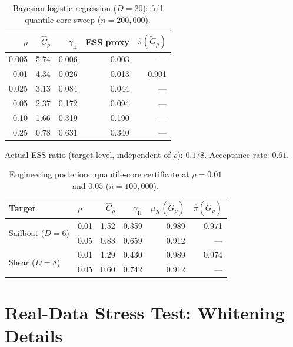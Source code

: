 \documentclass[12pt]{article}
\begin{document}
\begin{table}[h]
\centering
\caption{Bayesian logistic regression ($D = 20$): full quantile-core sweep ($n = 200{,}000$).}
\label{tab:q-logreg}
\small
\begin{tabular}{rrrrr}
\toprule
$\rho$ & $\hat{C}_\rho$ & $\gamma_{\mathrm{II}}$ & ESS proxy & $\hat{\pi}(\tilde{G}_\rho)$ \\
\midrule
0.005 & 5.74 & 0.006 & 0.003 & --- \\
0.01  & 4.34 & 0.026 & 0.013 & 0.901 \\
0.025 & 3.13 & 0.084 & 0.044 & --- \\
0.05  & 2.37 & 0.172 & 0.094 & --- \\
0.10  & 1.66 & 0.319 & 0.190 & --- \\
0.25  & 0.78 & 0.631 & 0.340 & --- \\
\bottomrule
\end{tabular}

\smallskip
\begin{minipage}{\linewidth}
\small Actual ESS ratio (target-level, independent of $\rho$): $0.178$. Acceptance rate: $0.61$.
\end{minipage}
\end{table}

\begin{table}[h]
\centering
\caption{Engineering posteriors: quantile-core certificate at $\rho = 0.01$ and $0.05$ ($n = 100{,}000$).}
\label{tab:q-eng}
\small
\begin{tabular}{ll rrrr}
\toprule
Target & $\rho$ & $\hat{C}_\rho$ & $\gamma_{\mathrm{II}}$ & $\mu_K(\tilde{G}_\rho)$ & $\hat{\pi}(\tilde{G}_\rho)$ \\
\midrule
\multirow{2}{*}{Sailboat ($D=6$)}
 & 0.01 & 1.52 & 0.359 & 0.989 & 0.971 \\
 & 0.05 & 0.83 & 0.659 & 0.912 & --- \\
\midrule
\multirow{2}{*}{Shear ($D=8$)}
 & 0.01 & 1.29 & 0.430 & 0.989 & 0.974 \\
 & 0.05 & 0.60 & 0.742 & 0.912 & --- \\
\bottomrule
\end{tabular}
\end{table}


\section{Real-Data Stress Test: Whitening Details}\label{supp:whitening}
\end{document}

